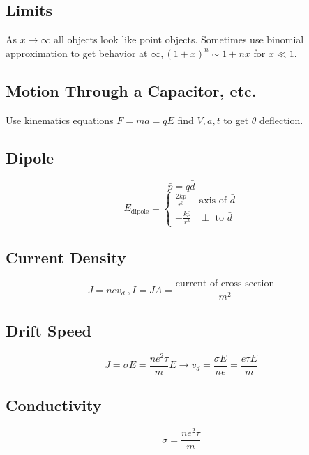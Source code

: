 \documentclass[10pt,a4paper]{article}
\begin{document}
\subsection{Limits} %
\label{sub:limits}
As $x \rightarrow \infty$ all objects look like point objects. Sometimes use binomial approximation to get behavior at $\infty, (1+x)^n \sim 1+nx$ for $x \ll 1$.
\subsection{Motion Through a Capacitor, etc.} %
\label{sub:motion_through_a_capacitor}
Use kinematics equations $F=ma=qE$ find $V,a,t$ to get $\theta $ deflection.
\subsection{Dipole} %
\label{sub:dipole}
\begin{equation}
    \bar{p} = q \bar{d}
\end{equation}
\[
 \bar{E}_{\textrm{dipole}} =
  \begin{cases}
   \frac{2k\bar{p}}{r^3}  & \textrm{axis of }\bar{d}  \\
   -\frac{k \bar{p}}{r^3} &  \perp \textrm{ to }\bar{d}
  \end{cases}
\]

\subsection{Current Density} %
\label{sub:current_density}
\begin{equation}
    J = nev_d~,I=JA=\frac{\textrm{current of cross section}}{m^2}
\end{equation}
\subsection{Drift Speed} %
\label{sub:drift_speed}
\begin{equation}
    J = \sigma E= \frac{ne^2\tau}{m}E \rightarrow v_d = \frac{\sigma E }{ne} = \frac{e \tau E}{m}
\end{equation}
\subsection{Conductivity} %
\label{sub:conductivity}
\begin{equation}
    \sigma = \frac{ne^2\tau}{m}
\end{equation}
\end{document}
